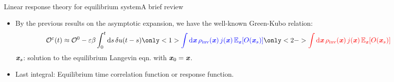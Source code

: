 \documentclass[fleqn]{beamer}
\newcommand{\redc}[1]{{\color{red} #1}}
\newcommand{\bluec}[1]{{\color{blue} #1}}
\newcommand{\vect}[1]{\textbf{\textit{#1}}}
\newcommand{\dd}[0]{\textrm{d}}
\newcommand{\fe}{u}
\newcommand{\eps}{\varepsilon}
\newcommand{\mo}{\mathcal O}
\newcommand{\inv}{{\textrm{inv}}}
\begin{document}
\begin{frame}{Linear response theory for equilibrium system}{A brief review}
  \begin{itemize}
    \vfill
  \item <1-> By the previous results on the asymptotic expansion,
    we have the well-known Green-Kubo relation:
    \bluec{
      \begin{align*}
        \mo^\eps(t) \approx
        \mo^0
        -
        \eps\beta
        \int_0^t\dd s\,
        \delta\fe(t-s)
        \only<1>{
        \bluec{
        \int \dd \vect x\,
        \rho_{\inv}(\vect x)\,
        j(\vect x)\,
        \mathbb E_{\vect x} [O(\vect x_s)]}}
        \only<2->{
        \redc{
        \int \dd \vect x\,
        \rho_{\inv}(\vect x)\,
        j(\vect x)\,
        \mathbb E_{\vect x} [O(\vect x_s)]}}
      \end{align*}
    }
    \bluec{$\vect x_s$}: solution to the \redc{equilibrium} Langevin eqn. with \bluec{$\vect x_0 = \vect x$}.
    \vfill
  \item <2-> {Last integral: \redc{Equilibrium time correlation function} or \redc{response function}.}
    \vfill
  \end{itemize}
\end{frame}

\end{document}
